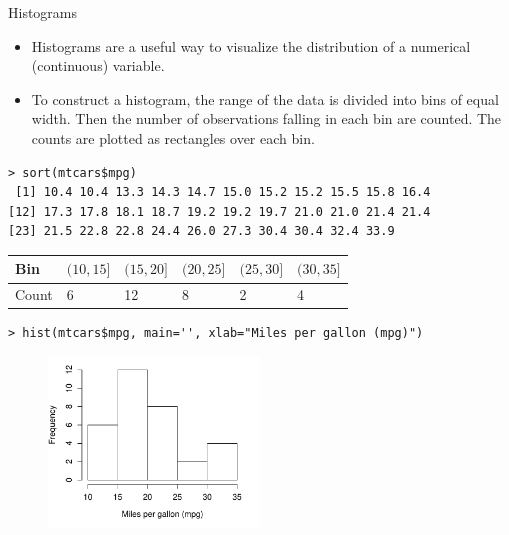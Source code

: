 \documentclass[10pt]{beamer}
\begin{document}
\begin{frame}[fragile]{Histograms}
\begin{itemize}
\item Histograms are a useful way to visualize the distribution of a numerical (continuous) variable.
\vspace{5pt}
\item To construct a histogram, the range of the data is divided into bins of equal width.  Then the number of observations falling in each bin are counted.  The counts are plotted as rectangles over each bin.
\end{itemize}
\end{frame}

\begin{frame}[fragile]
\small
\begin{verbatim}
> sort(mtcars$mpg)
 [1] 10.4 10.4 13.3 14.3 14.7 15.0 15.2 15.2 15.5 15.8 16.4
[12] 17.3 17.8 18.1 18.7 19.2 19.2 19.7 21.0 21.0 21.4 21.4
[23] 21.5 22.8 22.8 24.4 26.0 27.3 30.4 30.4 32.4 33.9
\end{verbatim}

\begin{tabular}{l|lllll}
Bin & $(10, 15]$ & $(15, 20]$ & $(20, 25]$ & $(25, 30]$ & $(30,35]$\\
\hline
Count & 6 & 12 & 8 & 2 & 4\\
\end{tabular}

\begin{verbatim}
> hist(mtcars$mpg, main='', xlab="Miles per gallon (mpg)")
\end{verbatim}

\begin{figure}[htbp]
\centering
\includegraphics[width=0.5\textwidth]{figure/hist_mpg1.pdf}
\end{figure}
\end{frame}

% 
% 
% 
% 
\end{document}
